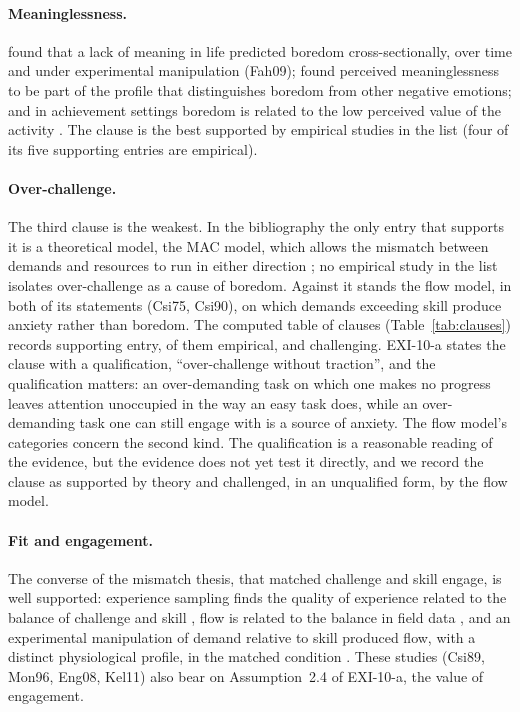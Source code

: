 \documentclass{situationist-preprint}
\begin{document}
\paragraph{Meaninglessness.} \citet{Fahlman2009} found that a lack of meaning in life predicted boredom cross-sectionally, over time and under experimental manipulation (Fah09); \citet{vanTilburgIgou2012,vanTilburgIgou2017} found perceived meaninglessness to be part of the profile that distinguishes boredom from other negative emotions; and in achievement settings boredom is related to the low perceived value of the activity \citep{Pekrun2010}. The clause is the best supported by empirical studies in the list (four of its five supporting entries are empirical).

\paragraph{Over-challenge.} The third clause is the weakest. In the bibliography the only entry that supports it is a theoretical model, the MAC model, which allows the mismatch between demands and resources to run in either direction \citep{WestgateWilson2018}; no empirical study in the list isolates over-challenge as a cause of boredom. Against it stands the flow model, in both of its statements (Csi75, Csi90), on which demands exceeding skill produce anxiety rather than boredom. The computed table of clauses (Table~\ref{tab:clauses}) records \stoverpos{} supporting entry, \stoverposemp{} of them empirical, and \stoverneg{} challenging. EXI-10-a states the clause with a qualification, \enquote{over-challenge without traction}, and the qualification matters: an over-demanding task on which one makes no progress leaves attention unoccupied in the way an easy task does, while an over-demanding task one can still engage with is a source of anxiety. The flow model's categories concern the second kind. The qualification is a reasonable reading of the evidence, but the evidence does not yet test it directly, and we record the clause as supported by theory and challenged, in an unqualified form, by the flow model.

\paragraph{Fit and engagement.} The converse of the mismatch thesis, that matched challenge and skill engage, is well supported: experience sampling finds the quality of experience related to the balance of challenge and skill \citep{CsikszentmihalyiLeFevre1989,MonetaCsikszentmihalyi1996}, flow is related to the balance in field data \citep{EngeserRheinberg2008}, and an experimental manipulation of demand relative to skill produced flow, with a distinct physiological profile, in the matched condition \citep{Keller2011}. These studies (Csi89, Mon96, Eng08, Kel11) also bear on Assumption~2.4 of EXI-10-a, the value of engagement.
\end{document}
